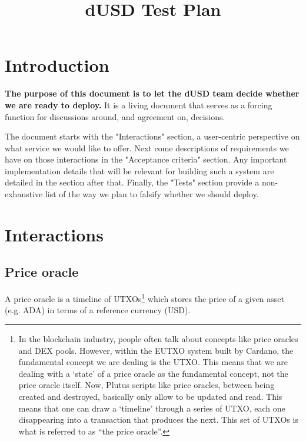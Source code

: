 \documentclass{article} %
\title{dUSD Test Plan}
\begin{document}
\maketitle

\section{Introduction}

\textbf{The purpose of this document is to let the dUSD team decide whether we are ready to deploy.}
It is a living document that serves as a forcing function for discussions around, and agreement on, decisions.

The document starts with the "Interactions" section, a user-centric perspective on what service we would like to offer.
Next come descriptions of requirements we have on those interactions in the "Acceptance criteria" section.
Any important implementation details that will be relevant for building such a system are detailed in the section after that.
Finally, the "Tests" section provide a non-exhaustive list of the way we plan to falsify whether we should deploy.

\section{Interactions}

\subsection{Price oracle}


A price oracle is a timeline of UTXOs\footnote{
  In the blockchain industry, people often talk about concepts like price
  oracles and DEX pools. However, within the EUTXO system built by Cardano, the
  fundamental concept we are dealing is the UTXO. This means that we are dealing
  with a `state' of a price oracle as the fundamental concept, not the price
  oracle itself. Now, Plutus scripts like price oracles, between being created
  and destroyed, basically only allow to be updated and read. This means that
  one can draw a `timeline' through a series of UTXO, each one disappearing into
  a transaction that produces the next. This set of UTXOs is what is referred to
  as ``the price oracle''.
}
which stores the price of a given asset (e.g. ADA) in terms of a reference
currency (USD). \\
\end{document}

